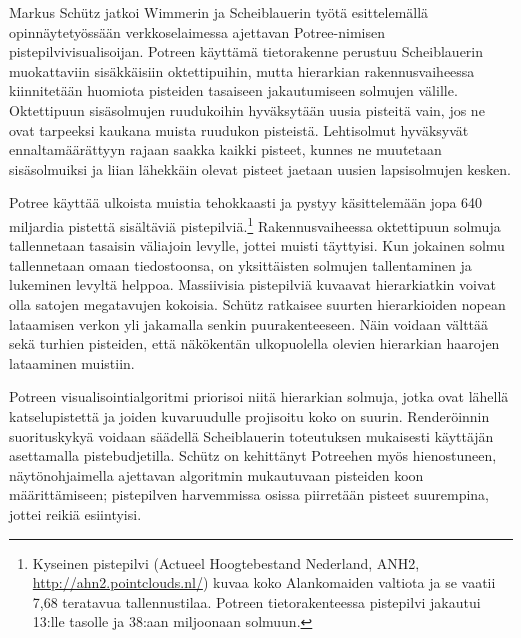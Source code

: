 Markus Schütz jatkoi Wimmerin ja Scheiblauerin työtä esittelemällä opinnäytetyössään verkkoselaimessa ajettavan Potree-nimisen pistepilvivisualisoijan. Potreen käyttämä tietorakenne perustuu Scheiblauerin muokattaviin sisäkkäisiin oktettipuihin, mutta hierarkian rakennusvaiheessa kiinnitetään huomiota pisteiden tasaiseen jakautumiseen solmujen välille. Oktettipuun sisäsolmujen ruudukoihin hyväksytään uusia pisteitä vain, jos ne ovat tarpeeksi kaukana muista ruudukon pisteistä. Lehtisolmut hyväksyvät ennaltamäärättyyn rajaan saakka kaikki pisteet, kunnes ne muutetaan sisäsolmuiksi ja liian lähekkäin olevat pisteet jaetaan uusien lapsisolmujen kesken. \cite{potree}

Potree käyttää ulkoista muistia tehokkaasti ja pystyy käsittelemään jopa 640 miljardia pistettä sisältäviä pistepilviä.\footnote{Kyseinen pistepilvi (Actueel Hoogtebestand Nederland, ANH2, \url{http://ahn2.pointclouds.nl/}) kuvaa koko Alankomaiden valtiota ja se vaatii 7,68 teratavua tallennustilaa. Potreen tietorakenteessa pistepilvi jakautui 13:lle tasolle ja 38:aan miljoonaan solmuun.} Rakennusvaiheessa oktettipuun solmuja tallennetaan tasaisin väliajoin levylle, jottei muisti täyttyisi. Kun jokainen solmu tallennetaan omaan tiedostoonsa, on yksittäisten solmujen tallentaminen ja lukeminen levyltä helppoa. Massiivisia pistepilviä kuvaavat hierarkiatkin voivat olla satojen megatavujen kokoisia. Schütz ratkaisee suurten hierarkioiden nopean lataamisen verkon yli jakamalla senkin puurakenteeseen. Näin voidaan välttää sekä turhien pisteiden, että näkökentän ulkopuolella olevien hierarkian haarojen lataaminen muistiin. \cite{potree}

Potreen visualisointialgoritmi priorisoi niitä hierarkian solmuja, jotka ovat lähellä katselupistettä ja joiden kuvaruudulle projisoitu koko on suurin. Renderöinnin suorituskykyä voidaan säädellä Scheiblauerin toteutuksen mukaisesti käyttäjän asettamalla pistebudjetilla. Schütz on kehittänyt Potreehen myös hienostuneen, näytönohjaimella ajettavan algoritmin mukautuvaan pisteiden koon määrittämiseen; pistepilven harvemmissa osissa piirretään pisteet suurempina, jottei reikiä esiintyisi. \cite{potree}